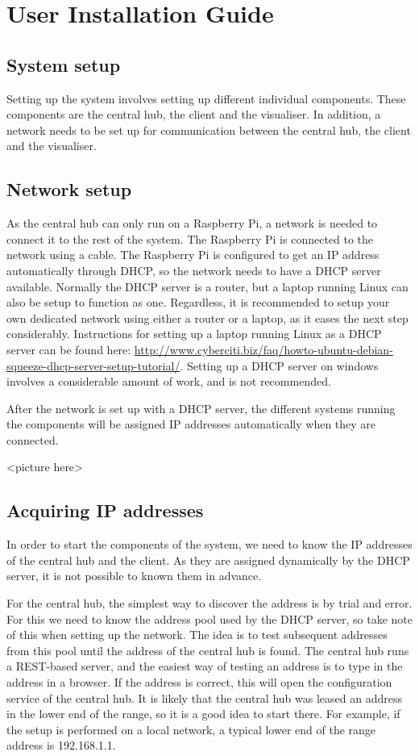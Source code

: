 \documentclass[../document.tex]{subfiles}
\begin{document}
\section{User Installation Guide}

\subsection{System setup}
Setting up the system involves setting up different individual components. These components are the central hub, the client and the visualiser. In addition, a network needs to be set up for communication between the central hub, the client and the visualiser.

\subsection{Network setup}
As the central hub can only run on a Raspberry Pi, a network is needed to connect it to the rest of the system. The Raspberry Pi is connected to the network using a cable. The Raspberry Pi is configured to get an IP address automatically through DHCP, so the network needs to have a DHCP server available. Normally the DHCP server is a router, but a laptop running Linux can also be setup to function as one. Regardless, it is recommended to setup your own dedicated network using either a router or a laptop, as it eases the next step considerably. Instructions for setting up a laptop running Linux as a DHCP server can be found here:
	\url{http://www.cyberciti.biz/faq/howto-ubuntu-debian-squeeze-dhcp-server-setup-tutorial/}.
Setting up a DHCP server on windows involves a considerable amount of work, and is not recommended.

After the network is set up with a DHCP server, the different systems running the components will be assigned IP addresses automatically when they are connected.

{\color{red} <picture here>}

\subsection{Acquiring IP addresses}
In order to start the components of the system, we need to know the IP addresses of the central hub and the client. As they are assigned dynamically by the DHCP server, it is not possible to known them in advance.

For the central hub, the simplest way to discover the address is by trial and error. For this we need to know the address pool used by the DHCP server, so take note of this when setting up the network. The idea is to test subsequent addresses from this pool until the address of the central hub is found. The central hub runs a REST-based server, and the easiest way of testing an address is to type in the address in a browser. If the address is correct, this will open the configuration service of the central hub. It is likely that the central hub was leased an address in the lower end of the range, so it is a good idea to start there. For example, if the setup is performed on a local network, a typical lower end of the range address is 192.168.1.1.
\end{document}
